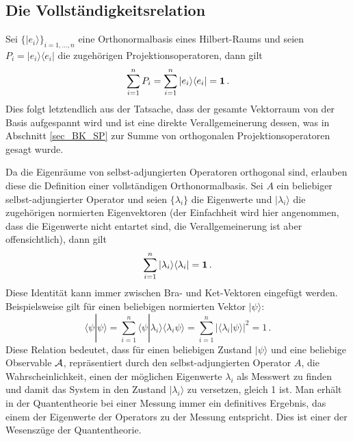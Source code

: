 \subsection{Die Vollst\"andigkeitsrelation}
\label{sec_BK_Vollstaendig}

Sei $\{ |e_i\rangle \}_{i=1,...,n}$ eine Orthonormalbasis eines Hilbert-Raums und
seien $P_i = | e_i \rangle \langle e_i|$ die zugeh\"origen Projektionsoperatoren, dann gilt
\begin{equation}
            \sum_{i=1}^n P_i = \sum_{i=1}^n | e_i \rangle \langle e_i| = {\bf 1} \, .
\end{equation}
Dies folgt letztendlich aus der Tatsache, dass der gesamte Vektorraum von der Basis
aufgespannt wird und ist eine direkte Verallgemeinerung dessen, was in Abschnitt
\ref{sec_BK_SP} zur Summe von orthogonalen Projektionsoperatoren gesagt wurde. 

Da die Eigenr\"aume von selbst-adjungierten Operatoren orthogonal sind, erlauben diese
die Definition einer vollst\"andigen Orthonormalbasis. Sei $A$ ein beliebiger selbst-adjungierter
Operator und seien $\{\lambda_i\}$ die Eigenwerte und $|\lambda_i\rangle$ die zugeh\"origen
normierten Eigenvektoren (der Einfachheit wird hier angenommen, dass die Eigenwerte nicht
entartet sind, die Verallgemeinerung ist aber offensichtlich), dann gilt 
\begin{equation}
             \sum_{i=1}^n | \lambda_i \rangle \langle \lambda_i| = {\bf 1} \, .
\end{equation}
Diese Identit\"at kann immer zwischen Bra- und Ket-Vektoren eingef\"ugt werden. Beispielsweise
gilt f\"ur einen beliebigen normierten Vektor $|\psi\rangle$:
\begin{equation}
      \langle \psi| \psi \rangle = \sum_{i=1}^n \langle \psi | \lambda_i \rangle \langle \lambda_i \psi \rangle 
              = \sum_{i=1}^n | \langle \lambda_i | \psi \rangle |^2   = 1 \,  .
\end{equation}
Diese Relation bedeutet, dass f\"ur einen beliebigen Zustand $|\psi\rangle$ und eine beliebige
Observable ${\cal A}$, repr\"asentiert durch den selbst-adjungierten Operator $A$, die
Wahrscheinlichkeit, einen der m\"oglichen Eigenwerte $\lambda_i$ als Messwert zu finden und
damit das System in den Zustand $|\lambda_i\rangle$ zu versetzen, gleich 1 ist. Man erh\"alt
in der Quantentheorie bei einer Messung immer ein definitives Ergebnis, das einem der
Eigenwerte der Operators zu der Messung entspricht. Dies ist einer der Wesensz\"uge der
Quantentheorie.

